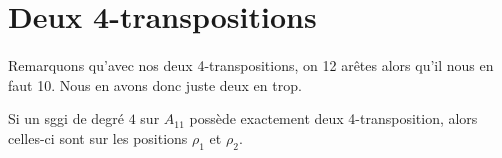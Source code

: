 \section{Deux 4-transpositions}

\paragraph{}
Remarquons qu'avec nos deux 4-transpositions, on 12 arêtes alors qu'il nous en faut 10. Nous en avons donc juste deux en trop.

\begin{theorem}
  Si un sggi de degré $4$ sur $A_{11}$ possède exactement deux 4-transposition, alors celles-ci sont sur les positions $\rho_1$ et $\rho_2$.
\end{theorem}

